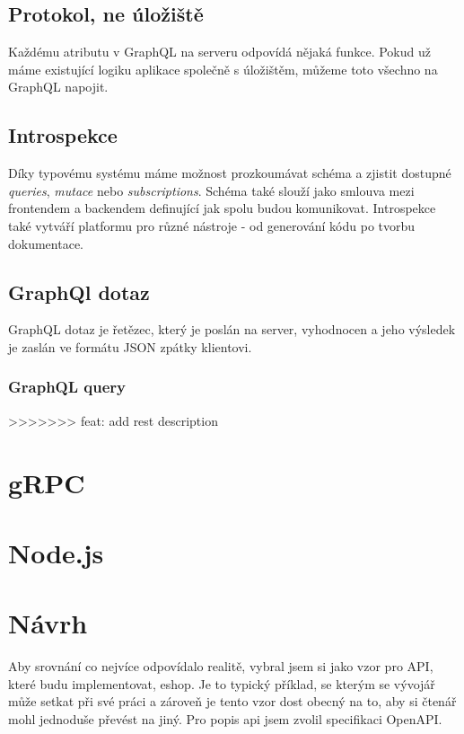 \documentclass[thesis=M,czech]{FITthesis}[2019/12/23]
\begin{document}
\subsection*{Protokol, ne úložiště}
Každému atributu v GraphQL na serveru odpovídá nějaká funkce. Pokud už máme existující logiku aplikace společně s úložištěm, můžeme toto všechno na GraphQL napojit.

\subsection*{Introspekce}
Díky typovému systému máme možnost prozkoumávat schéma a zjistit dostupné \textit{queries}, \textit{mutace} nebo \textit{subscriptions}. Schéma také slouží jako smlouva mezi frontendem a backendem definující jak spolu budou komunikovat.
Introspekce také vytváří platformu pro různé nástroje - od generování kódu po tvorbu dokumentace.

\subsection*{GraphQl dotaz}
GraphQL dotaz je řetězec, který je poslán na server, vyhodnocen a jeho výsledek je zaslán ve formátu JSON zpátky klientovi.

\subsubsection*{GraphQL query}



>>>>>>> feat: add rest description

\section{gRPC}

\section{Node.js }
\section{Návrh}
Aby srovnání co nejvíce odpovídalo realitě, vybral jsem si jako vzor pro API, které budu implementovat, eshop. Je to typický příklad, se kterým se vývojář může setkat při své práci a zároveň je tento vzor dost obecný na to, aby si čtenář mohl jednoduše převést na jiný. Pro popis api jsem zvolil specifikaci OpenAPI.
\end{document}
